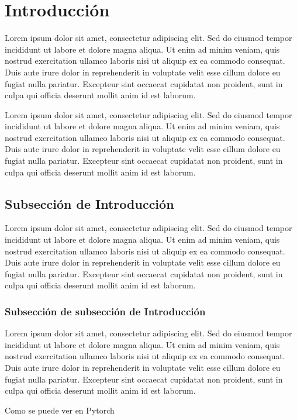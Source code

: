 \section{Introducción}
Lorem ipsum dolor sit amet, consectetur adipiscing elit. Sed do eiusmod tempor incididunt ut labore et dolore magna aliqua. 
Ut enim ad minim veniam, quis nostrud exercitation ullamco laboris nisi ut aliquip ex ea commodo consequat. Duis aute irure dolor 
in reprehenderit in voluptate velit esse cillum dolore eu fugiat nulla pariatur. Excepteur sint occaecat cupidatat non proident, 
sunt in culpa qui officia deserunt mollit anim id est laborum.

Lorem ipsum dolor sit amet, consectetur adipiscing elit. Sed do eiusmod tempor incididunt ut labore et dolore magna aliqua. 
Ut enim ad minim veniam, quis nostrud exercitation ullamco laboris nisi ut aliquip ex ea commodo consequat. Duis aute irure dolor 
in reprehenderit in voluptate velit esse cillum dolore eu fugiat nulla pariatur. Excepteur sint occaecat cupidatat non proident, 
sunt in culpa qui officia deserunt mollit anim id est laborum.

\subsection{Subsección de Introducción}
Lorem ipsum dolor sit amet, consectetur adipiscing elit. Sed do eiusmod tempor incididunt ut labore et dolore magna aliqua. 
Ut enim ad minim veniam, quis nostrud exercitation ullamco laboris nisi ut aliquip ex ea commodo consequat. Duis aute irure dolor 
in reprehenderit in voluptate velit esse cillum dolore eu fugiat nulla pariatur. Excepteur sint occaecat cupidatat non proident, 
sunt in culpa qui officia deserunt mollit anim id est laborum.

\subsubsection{Subsección de subsección de Introducción}
Lorem ipsum dolor sit amet, consectetur adipiscing elit. Sed do eiusmod tempor incididunt ut labore et dolore magna aliqua. 
Ut enim ad minim veniam, quis nostrud exercitation ullamco laboris nisi ut aliquip ex ea commodo consequat. Duis aute irure dolor 
in reprehenderit in voluptate velit esse cillum dolore eu fugiat nulla pariatur. Excepteur sint occaecat cupidatat non proident, 
sunt in culpa qui officia deserunt mollit anim id est laborum.

Como se puede ver en Pytorch \cite{pytorch}

